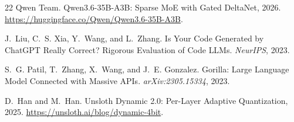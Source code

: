 \documentclass[11pt,a4paper]{article}
\begin{document}
\begin{thebibliography}{22}
{Qwen Team}.
\newblock Qwen3.6-35B-A3B: Sparse {MoE} with Gated {DeltaNet}, 2026.
\newblock \url{https://huggingface.co/Qwen/Qwen3.6-35B-A3B}.

J.~Liu, C.~S. Xia, Y.~Wang, and L.~Zhang.
\newblock Is Your Code Generated by {ChatGPT} Really Correct? {R}igorous Evaluation of Code {LLMs}.
\newblock \emph{NeurIPS}, 2023.

S.~G. Patil, T.~Zhang, X.~Wang, and J.~E. Gonzalez.
\newblock Gorilla: Large Language Model Connected with Massive {APIs}.
\newblock \emph{arXiv:2305.15334}, 2023.

D.~Han and M.~Han.
\newblock Unsloth Dynamic 2.0: Per-Layer Adaptive Quantization, 2025.
\newblock \url{https://unsloth.ai/blog/dynamic-4bit}.

\end{thebibliography}
\end{document}
